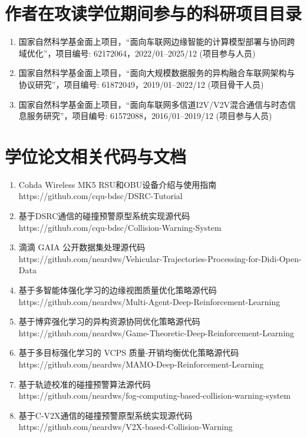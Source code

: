 \section{作者在攻读学位期间参与的科研项目目录}
\begin{enumerate}
	\item 国家自然科学基金面上项目，“面向车联网边缘智能的计算模型部署与协同跨域优化”，项目编号: 62172064，2022/01–2025/12 (项目参与人员)
	\item 国家自然科学基金面上项目，“面向大规模数据服务的异构融合车联网架构与协议研究”，项目编号: 61872049，2019/01–2022/12 (项目骨干人员)
	\item 国家自然科学基金面上项目，“面向车联网多信道I2V/V2V混合通信与时态信息服务研究”，项目编号: 61572088，2016/01–2019/12 (项目参与人员)
\end{enumerate}

\section{学位论文相关代码与文档}
\begin{enumerate}
	\item Cohda Wireless MK5 RSU和OBU设备介绍与使用指南\\https://github.com/cqu-bdsc/DSRC-Tutorial
	\item 基于DSRC通信的碰撞预警原型系统实现源代码\\https://github.com/cqu-bdsc/Collision-Warning-System
	\item 滴滴 GAIA 公开数据集处理源代码\\https://github.com/neardws/Vehicular-Trajectories-Processing-for-Didi-Open-Data
	\item 基于多智能体强化学习的边缘视图质量优化策略源代码\\https://github.com/neardws/Multi-Agent-Deep-Reinforcement-Learning
	\item 基于博弈强化学习的异构资源协同优化策略源代码\\https://github.com/neardws/Game-Theoretic-Deep-Reinforcement-Learning
	\item 基于多目标强化学习的 VCPS 质量-开销均衡优化策略源代码\\https://github.com/neardws/MAMO-Deep-Reinforcement-Learning
	\item 基于轨迹校准的碰撞预警算法源代码\\https://github.com/neardws/fog-computing-based-collision-warning-system
	\item 基于C-V2X通信的碰撞预警原型系统实现源代码\\https://github.com/neardws/V2X-based-Collision-Warning
\end{enumerate}

